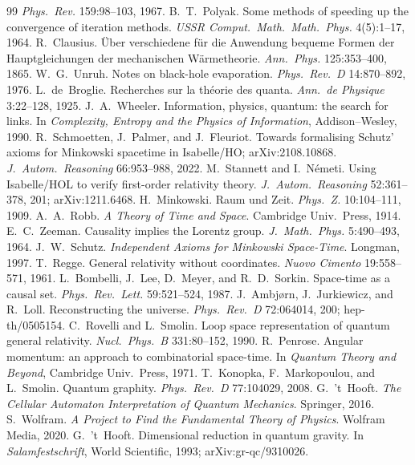 \documentclass[10pt,twocolumn]{article}
\theoremstyle{definition}
\begin{document}
\begin{thebibliography}{99}
\emph{Phys.\ Rev.} 159:98--103, 1967.
 B.~T.~Polyak. Some methods of speeding up the convergence of
iteration methods. \emph{USSR Comput.\ Math.\ Math.\ Phys.} 4(5):1--17, 1964.
 R.~Clausius. \"Uber verschiedene f\"ur die Anwendung bequeme
Formen der Hauptgleichungen der mechanischen W\"armetheorie.
\emph{Ann.\ Phys.} 125:353--400, 1865.
 W.~G.~Unruh. Notes on black-hole evaporation.
\emph{Phys.\ Rev.\ D} 14:870--892, 1976.
 L.~de~Broglie. Recherches sur la th\'eorie des quanta.
\emph{Ann.\ de Physique} 3:22--128, 1925.
 J.~A.~Wheeler. Information, physics, quantum: the search for
links. In \emph{Complexity, Entropy and the Physics of Information},
Addison--Wesley, 1990.
 R.~Schmoetten, J.~Palmer, and J.~Fleuriot. Towards
formalising Schutz' axioms for Minkowski spacetime in Isabelle/HO; arXiv:2108.10868.
\emph{J.\ Autom.\ Reasoning} 66:953--988, 2022.
 M.~Stannett and I.~N\'emeti. Using Isabelle/HOL to verify
first-order relativity theory. \emph{J.\ Autom.\ Reasoning} 52:361--378, 201; arXiv:1211.6468.
 H.~Minkowski. Raum und Zeit. \emph{Phys.\ Z.} 10:104--111, 1909.
 A.~A.~Robb. \emph{A Theory of Time and Space}. Cambridge Univ.\ Press, 1914.
 E.~C.~Zeeman. Causality implies the Lorentz group. \emph{J.\ Math.\ Phys.} 5:490--493, 1964.
 J.~W.~Schutz. \emph{Independent Axioms for Minkowski Space-Time}. Longman, 1997.
 T.~Regge. General relativity without coordinates. \emph{Nuovo Cimento} 19:558--571, 1961.
 L.~Bombelli, J.~Lee, D.~Meyer, and R.~D.~Sorkin. Space-time as a causal set. \emph{Phys.\ Rev.\ Lett.} 59:521--524, 1987.
 J.~Ambj{\o}rn, J.~Jurkiewicz, and R.~Loll. Reconstructing the universe. \emph{Phys.\ Rev.\ D} 72:064014, 200; hep-th/0505154.
 C.~Rovelli and L.~Smolin. Loop space representation of quantum general relativity. \emph{Nucl.\ Phys.\ B} 331:80--152, 1990.
 R.~Penrose. Angular momentum: an approach to combinatorial space-time. In \emph{Quantum Theory and Beyond}, Cambridge Univ.\ Press, 1971.
 T.~Konopka, F.~Markopoulou, and L.~Smolin. Quantum graphity. \emph{Phys.\ Rev.\ D} 77:104029, 2008.
 G.~'t~Hooft. \emph{The Cellular Automaton Interpretation of Quantum Mechanics}. Springer, 2016.
 S.~Wolfram. \emph{A Project to Find the Fundamental Theory of Physics}. Wolfram Media, 2020.
 G.~'t~Hooft. Dimensional reduction in quantum gravity. In \emph{Salamfestschrift}, World Scientific, 1993; arXiv:gr-qc/9310026.

\end{thebibliography}
\end{document}
